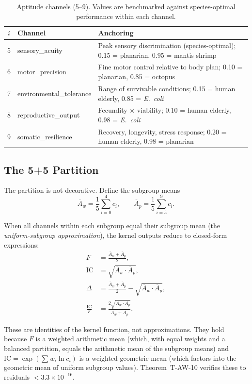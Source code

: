 \documentclass[
  aps,
  prd,
  twocolumn,
  superscriptaddress,
  nofootinbib,
  floatfix
]{revtex4-2}
\newcommand{\beq}{\begin{equation}}
\newcommand{\eeq}{\end{equation}}
\newcommand{\IC}{\mathrm{IC}}
\newcommand{\Aw}{\overline{A}_{\!w}}
\newcommand{\Ap}{\overline{A}_{\!p}}
\begin{document}
\begin{table}[h]
\caption{\label{tab:aptitude}Aptitude channels (5--9).
Values are benchmarked against species-optimal performance
within each channel.}
\begin{ruledtabular}
\begin{tabular}{clp{3.5cm}}
$i$ & Channel & Anchoring \\
\hline
5 & sensory\_acuity & Peak sensory discrimination
    (species-optimal); 0.15 = planarian,
    0.95 = mantis shrimp \\
6 & motor\_precision & Fine motor control relative to
    body plan; 0.10 = planarian,
    0.85 = octopus \\
7 & environmental\_tolerance & Range of survivable conditions;
    0.15 = human elderly, 0.85 = \textit{E.~coli} \\
8 & reproductive\_output & Fecundity $\times$ viability;
    0.10 = human elderly, 0.98 = \textit{E.~coli} \\
9 & somatic\_resilience & Recovery, longevity, stress
    response; 0.20 = human elderly,
    0.98 = planarian \\
\end{tabular}
\end{ruledtabular}
\end{table}

\subsection{The 5+5 Partition}

The partition is not decorative.  Define the subgroup means
\beq
  \Aw = \frac{1}{5}\sum_{i=0}^{4} c_i, \qquad
  \Ap = \frac{1}{5}\sum_{i=5}^{9} c_i.
\eeq

When all channels within each subgroup equal their subgroup
mean (the \emph{uniform-subgroup approximation}), the kernel
outputs reduce to closed-form expressions:
\begin{align}
  F &= \frac{\Aw + \Ap}{2}, \label{eq:F_exact}\\
  \IC &= \sqrt{\Aw \cdot \Ap}, \label{eq:IC_exact}\\
  \Delta &= \frac{\Aw + \Ap}{2} - \sqrt{\Aw \cdot \Ap},
  \label{eq:delta_exact}\\
  \frac{\IC}{F} &= \frac{2\sqrt{\Aw \cdot \Ap}}
    {\Aw + \Ap}. \label{eq:coupling}
\end{align}

These are identities of the kernel function, not
approximations.  They hold because $F$ is a weighted
arithmetic mean (which, with equal weights and a balanced
partition, equals the arithmetic mean of the subgroup
means) and $\IC = \exp(\sum w_i \ln c_i)$ is a weighted
geometric mean (which factors into the geometric mean of
uniform subgroup values).  Theorem~T-AW-10 verifies these
to residuals $< 3.3 \times 10^{-16}$.
\end{document}
